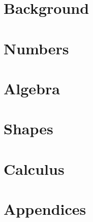 \documentclass{SBBook}
\begin{document}

\maketitle
\dominitoc


\tableofcontents
\listoffigures
\listoftables

\part{Background}


\part{Numbers}




\part{Algebra}


\part{Shapes}



\part{Calculus}


\part{Appendices} \label{Appendices}
\appendix



\end{document}

